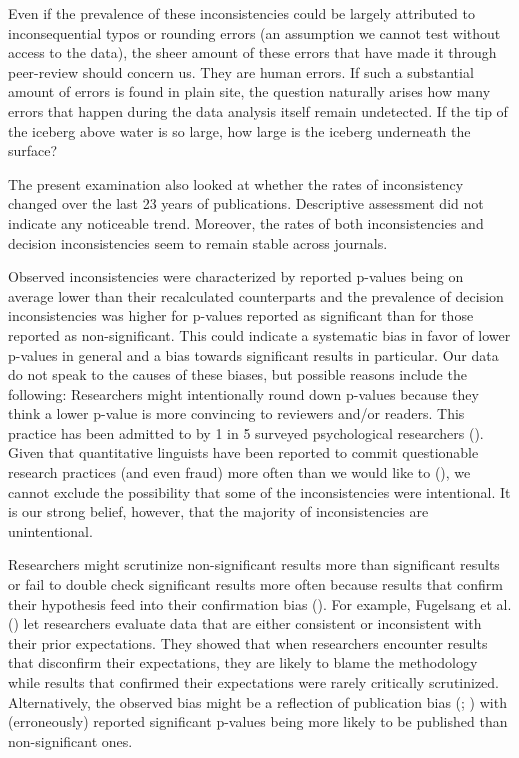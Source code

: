 \documentclass[
  doc,
  longtable,
  nolmodern,
  notxfonts,
  notimes,
  colorlinks=true,linkcolor=blue,citecolor=blue,urlcolor=blue]{apa7}
\begin{document}
Even if the prevalence of these inconsistencies could be largely
attributed to inconsequential typos or rounding errors (an assumption we
cannot test without access to the data), the sheer amount of these
errors that have made it through peer-review should concern us. They are
human errors. If such a substantial amount of errors is found in plain
site, the question naturally arises how many errors that happen during
the data analysis itself remain undetected. If the tip of the iceberg
above water is so large, how large is the iceberg underneath the
surface?

The present examination also looked at whether the rates of
inconsistency changed over the last 23 years of publications.
Descriptive assessment did not indicate any noticeable trend. Moreover,
the rates of both inconsistencies and decision inconsistencies seem to
remain stable across journals.

Observed inconsistencies were characterized by reported p-values being
on average lower than their recalculated counterparts and the prevalence
of decision inconsistencies was higher for p-values reported as
significant than for those reported as non-significant. This could
indicate a systematic bias in favor of lower p-values in general and a
bias towards significant results in particular. Our data do not speak to
the causes of these biases, but possible reasons include the following:
Researchers might intentionally round down p-values because they think a
lower p-value is more convincing to reviewers and/or readers. This
practice has been admitted to by 1 in 5 surveyed psychological
researchers (). Given
that quantitative linguists have been reported to commit questionable
research practices (and even fraud) more often than we would like to
(), we cannot
exclude the possibility that some of the inconsistencies were
intentional. It is our strong belief, however, that the majority of
inconsistencies are unintentional.

Researchers might scrutinize non-significant results more than
significant results or fail to double check significant results more
often because results that confirm their hypothesis feed into their
confirmation bias (). For example, Fugelsang et al.
() let researchers evaluate data
that are either consistent or inconsistent with their prior
expectations. They showed that when researchers encounter results that
disconfirm their expectations, they are likely to blame the methodology
while results that confirmed their expectations were rarely critically
scrutinized. Alternatively, the observed bias might be a reflection of
publication bias (; ) with
(erroneously) reported significant p-values being more likely to be
published than non-significant ones.
\end{document}
